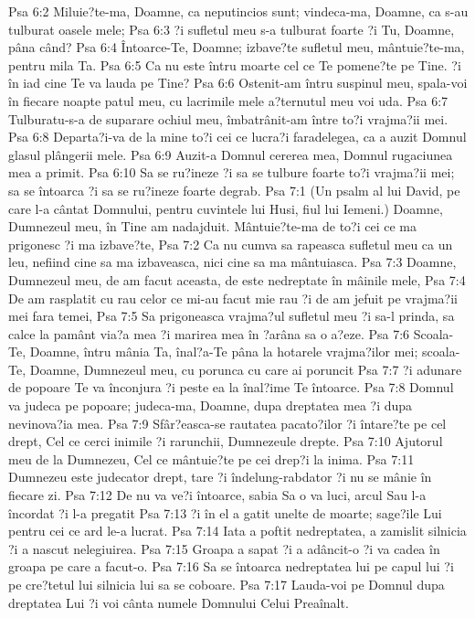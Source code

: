 Psa 6:2  Miluie?te-ma, Doamne, ca neputincios sunt; vindeca-ma, Doamne, ca s-au tulburat oasele mele;
Psa 6:3  ?i sufletul meu s-a tulburat foarte ?i Tu, Doamne, pâna când?
Psa 6:4  Întoarce-Te, Doamne; izbave?te sufletul meu, mântuie?te-ma, pentru mila Ta.
Psa 6:5  Ca nu este întru moarte cel ce Te pomene?te pe Tine. ?i în iad cine Te va lauda pe Tine?
Psa 6:6  Ostenit-am întru suspinul meu, spala-voi în fiecare noapte patul meu, cu lacrimile mele a?ternutul meu voi uda.
Psa 6:7  Tulburatu-s-a de suparare ochiul meu, îmbatrânit-am între to?i vrajma?ii mei.
Psa 6:8  Departa?i-va de la mine to?i cei ce lucra?i faradelegea, ca a auzit Domnul glasul plângerii mele.
Psa 6:9  Auzit-a Domnul cererea mea, Domnul rugaciunea mea a primit.
Psa 6:10  Sa se ru?ineze ?i sa se tulbure foarte to?i vrajma?ii mei; sa se întoarca ?i sa se ru?ineze foarte degrab.
Psa 7:1  (Un psalm al lui David, pe care l-a cântat Domnului, pentru cuvintele lui Husi, fiul lui Iemeni.) Doamne, Dumnezeul meu, în Tine am nadajduit. Mântuie?te-ma de to?i cei ce ma prigonesc ?i ma izbave?te,
Psa 7:2  Ca nu cumva sa rapeasca sufletul meu ca un leu, nefiind cine sa ma izbaveasca, nici cine sa ma mântuiasca.
Psa 7:3  Doamne, Dumnezeul meu, de am facut aceasta, de este nedreptate în mâinile mele,
Psa 7:4  De am rasplatit cu rau celor ce mi-au facut mie rau ?i de am jefuit pe vrajma?ii mei fara temei,
Psa 7:5  Sa prigoneasca vrajma?ul sufletul meu ?i sa-l prinda, sa calce la pamânt via?a mea ?i marirea mea în ?arâna sa o a?eze.
Psa 7:6  Scoala-Te, Doamne, întru mânia Ta, înal?a-Te pâna la hotarele vrajma?ilor mei; scoala-Te, Doamne, Dumnezeul meu, cu porunca cu care ai poruncit
Psa 7:7  ?i adunare de popoare Te va înconjura ?i peste ea la înal?ime Te întoarce.
Psa 7:8  Domnul va judeca pe popoare; judeca-ma, Doamne, dupa dreptatea mea ?i dupa nevinova?ia mea.
Psa 7:9  Sfâr?easca-se rautatea pacato?ilor ?i întare?te pe cel drept, Cel ce cerci inimile ?i rarunchii, Dumnezeule drepte.
Psa 7:10  Ajutorul meu de la Dumnezeu, Cel ce mântuie?te pe cei drep?i la inima.
Psa 7:11  Dumnezeu este judecator drept, tare ?i îndelung-rabdator ?i nu se mânie în fiecare zi.
Psa 7:12  De nu va ve?i întoarce, sabia Sa o va luci, arcul Sau l-a încordat ?i l-a pregatit
Psa 7:13  ?i în el a gatit unelte de moarte; sage?ile Lui pentru cei ce ard le-a lucrat.
Psa 7:14  Iata a poftit nedreptatea, a zamislit silnicia ?i a nascut nelegiuirea.
Psa 7:15  Groapa a sapat ?i a adâncit-o ?i va cadea în groapa pe care a facut-o.
Psa 7:16  Sa se întoarca nedreptatea lui pe capul lui ?i pe cre?tetul lui silnicia lui sa se coboare.
Psa 7:17  Lauda-voi pe Domnul dupa dreptatea Lui ?i voi cânta numele Domnului Celui Preaînalt.
